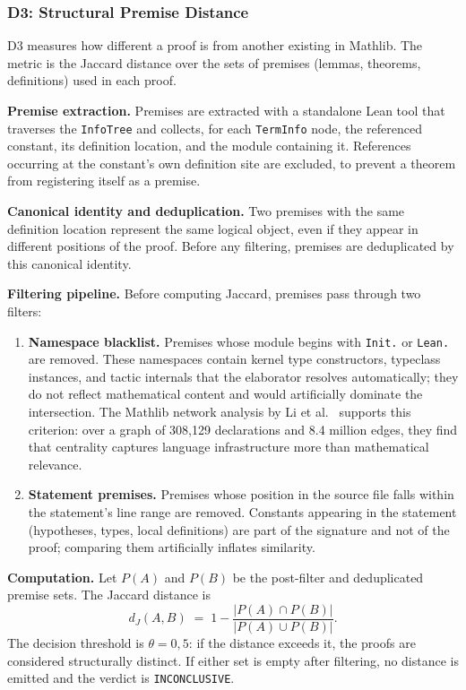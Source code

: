\subsubsection{D3: Structural Premise Distance}

D3 measures how different a proof is from another existing in Mathlib. The metric is the Jaccard distance over the sets of premises (lemmas, theorems, definitions) used in each proof.

\textbf{Premise extraction.} Premises are extracted with a standalone Lean tool that traverses the \texttt{InfoTree} and collects, for each \texttt{TermInfo} node, the referenced constant, its definition location, and the module containing it. References occurring at the constant's own definition site are excluded, to prevent a theorem from registering itself as a premise.

\textbf{Canonical identity and deduplication.} Two premises with the same definition location represent the same logical object, even if they appear in different positions of the proof. Before any filtering, premises are deduplicated by this canonical identity.

\textbf{Filtering pipeline.} Before computing Jaccard, premises pass through two filters:

\begin{enumerate}
\item \textbf{Namespace blacklist.} Premises whose module begins with \texttt{Init.} or \texttt{Lean.} are removed. These namespaces contain kernel type constructors, typeclass instances, and tactic internals that the elaborator resolves automatically; they do not reflect mathematical content and would artificially dominate the intersection. The Mathlib network analysis by Li et al.~\cite{network2026} supports this criterion: over a graph of 308,129 declarations and 8.4 million edges, they find that centrality captures language infrastructure more than mathematical relevance.

\item \textbf{Statement premises.} Premises whose position in the source file falls within the statement's line range are removed. Constants appearing in the statement (hypotheses, types, local definitions) are part of the signature and not of the proof; comparing them artificially inflates similarity.
\end{enumerate}

\textbf{Computation.} Let $P(A)$ and $P(B)$ be the post-filter and deduplicated premise sets. The Jaccard distance is
\[
d_J(A,B) \;=\; 1 - \frac{|P(A) \cap P(B)|}{|P(A) \cup P(B)|}.
\]
The decision threshold is $\theta = 0{,}5$: if the distance exceeds it, the proofs are considered structurally distinct. If either set is empty after filtering, no distance is emitted and the verdict is \texttt{INCONCLUSIVE}.

